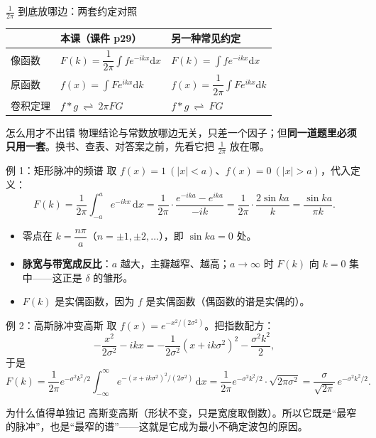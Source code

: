 \documentclass[aspectratio=169,10pt]{beamer}
\newcommand{\bstrong}[1]{{\color{deep}\bfseries #1}}
\newcommand{\bhl}[1]{{\color{mid}\bfseries #1}}
\begin{document}
\begin{frame}{$\frac{1}{2\pi}$ 到底放哪边：两套约定对照}
  \begin{center}\small
  \renewcommand{\arraystretch}{1.5}
  \begin{tabular}{@{}l l l@{}}
    \toprule
    & \bstrong{本课（课件 p29）} & \bstrong{另一种常见约定}\\
    \midrule
    像函数 & $F(k)=\dfrac{1}{2\pi}\displaystyle\int f e^{-ikx}\mathrm{d}x$ & $F(k)=\displaystyle\int f e^{-ikx}\mathrm{d}x$\\[6pt]
    原函数 & $f(x)=\displaystyle\int F e^{ikx}\mathrm{d}k$ & $f(x)=\dfrac{1}{2\pi}\displaystyle\int F e^{ikx}\mathrm{d}k$\\[6pt]
    卷积定理 & $f*g\ \rightleftharpoons\ 2\pi FG$ & $f*g\ \rightleftharpoons\ FG$\\
    \bottomrule
  \end{tabular}
  \end{center}
  \vspace{2pt}
  \begin{block}{怎么用才不出错}
    \small 物理结论与常数放哪边无关，只差一个因子；但\bhl{同一道题里必须只用一套}。换书、查表、对答案之前，先看它把 $\frac{1}{2\pi}$ 放在哪。
  \end{block}
\end{frame}

\begin{frame}{例 1：矩形脉冲的频谱}
  {\small 取 $f(x)=1\ (|x|<a)$、$f(x)=0\ (|x|>a)$，代入定义：}
  \[
    F(k)=\frac{1}{2\pi}\int_{-a}^{a}e^{-ikx}\,\mathrm{d}x
    =\frac{1}{2\pi}\cdot\frac{e^{-ika}-e^{ika}}{-ik}
    =\frac{1}{2\pi}\cdot\frac{2\sin ka}{k}
    =\frac{\sin ka}{\pi k}.
  \]
  \begin{itemize}\small
    \item 零点在 $k=\dfrac{n\pi}{a}$（$n=\pm1,\pm2,\dots$），即 $\sin ka=0$ 处。
    \item \bhl{脉宽与带宽成反比}：$a$ 越大，主瓣越窄、越高；$a\to\infty$ 时 $F(k)$ 向 $k=0$ 集中——这正是 $\delta$ 的雏形。
    \item $F(k)$ 是实偶函数，因为 $f$ 是实偶函数（偶函数的谱是实偶的）。
  \end{itemize}
\end{frame}

\begin{frame}{例 2：高斯脉冲变高斯}
  {\small 取 $f(x)=e^{-x^{2}/(2\sigma^{2})}$。把指数配方：}
  \[
    -\frac{x^{2}}{2\sigma^{2}}-ikx
    =-\frac{1}{2\sigma^{2}}\left(x+ik\sigma^{2}\right)^{2}-\frac{\sigma^{2}k^{2}}{2},
  \]
  {\small 于是}
  \[
    F(k)=\frac{1}{2\pi}e^{-\sigma^{2}k^{2}/2}\int_{-\infty}^{\infty}e^{-(x+ik\sigma^{2})^{2}/(2\sigma^{2})}\,\mathrm{d}x
    =\frac{1}{2\pi}e^{-\sigma^{2}k^{2}/2}\cdot\sqrt{2\pi\sigma^{2}}
    =\frac{\sigma}{\sqrt{2\pi}}\,e^{-\sigma^{2}k^{2}/2}.
  \]
  \begin{block}{为什么值得单独记}
    \small 高斯变高斯（形状不变，只是宽度取倒数）。所以它既是“最窄的脉冲”，也是“最窄的谱”——这就是它成为最小不确定波包的原因。
  \end{block}
\end{frame}
\end{document}
